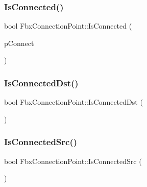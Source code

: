 \subsubsection{\texorpdfstring{Is\+Connected()}{IsConnected()}}
{\footnotesize\ttfamily bool Fbx\+Connection\+Point\+::\+Is\+Connected (\begin{DoxyParamCaption}\item[{\hyperlink{class_fbx_connection_point}{Fbx\+Connection\+Point} $\ast$}]{p\+Connect }\end{DoxyParamCaption})}

\mbox{\label{class_fbx_connection_point_a2912fa4a5e115ba7a3945bd7c75c6c0c}} 
\subsubsection{\texorpdfstring{Is\+Connected\+Dst()}{IsConnectedDst()}}
{\footnotesize\ttfamily bool Fbx\+Connection\+Point\+::\+Is\+Connected\+Dst (\begin{DoxyParamCaption}\item[{\hyperlink{class_fbx_connection_point}{Fbx\+Connection\+Point} $\ast$}]{ }\end{DoxyParamCaption})}

\mbox{\label{class_fbx_connection_point_accccefb83ec8fa6eda6bdab0d1b927f9}} 
\subsubsection{\texorpdfstring{Is\+Connected\+Src()}{IsConnectedSrc()}}
{\footnotesize\ttfamily bool Fbx\+Connection\+Point\+::\+Is\+Connected\+Src (\begin{DoxyParamCaption}\item[{\hyperlink{class_fbx_connection_point}{Fbx\+Connection\+Point} $\ast$}]{ }\end{DoxyParamCaption})}

\mbox{\label{class_fbx_connection_point_a7be04c356de5cd97c7c3f1c63b2830f1}} 
